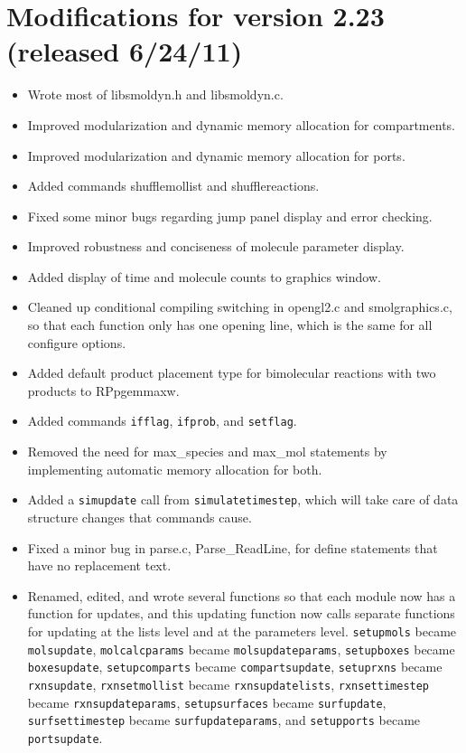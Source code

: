 \documentclass {scrbook}
\newcommand {\ttt} {\texttt}
\begin{document}
\section{Modifications for version 2.23 (released 6/24/11)}
\begin{itemize}
\item Wrote most of libsmoldyn.h and libsmoldyn.c.
\item Improved modularization and dynamic memory allocation for compartments.
\item Improved modularization and dynamic memory allocation for ports.
\item Added commands shufflemollist and shufflereactions.
\item Fixed some minor bugs regarding jump panel display and error checking.
\item Improved robustness and conciseness of molecule parameter display.
\item Added display of time and molecule counts to graphics window.
\item Cleaned up conditional compiling switching in opengl2.c and smolgraphics.c, so that each function only has one opening line, which is the same for all configure options.
\item Added default product placement type for bimolecular reactions with two products to RPpgemmaxw.
\item Added commands \ttt{ifflag}, \ttt{ifprob}, and \ttt{setflag}.
\item Removed the need for max\_species and max\_mol statements by implementing automatic memory allocation for both.
\item Added a \ttt{simupdate} call from \ttt{simulatetimestep}, which will take care of data structure changes that commands cause.
\item Fixed a minor bug in parse.c, Parse\_ReadLine, for define statements that have no replacement text.
\item Renamed, edited, and wrote several functions so that each module now has a function for updates, and this updating function now calls separate functions for updating at the lists level and at the parameters level. \ttt{setupmols} became \ttt{molsupdate}, \ttt{molcalcparams} became \ttt{molsupdateparams}, \ttt{setupboxes} became \ttt{boxesupdate}, \ttt{setupcomparts} became \ttt{compartsupdate}, \ttt{setuprxns} became \ttt{rxnsupdate}, \ttt{rxnsetmollist} became \ttt{rxnsupdatelists}, \ttt{rxnsettimestep} became \ttt{rxnsupdateparams}, \ttt{setupsurfaces} became \ttt{surfupdate}, \ttt{surfsettimestep} became \ttt{surfupdateparams}, and \ttt{setupports} became \ttt{portsupdate}.

\end{itemize}
\end{document}
